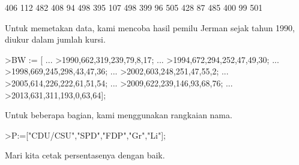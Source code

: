 \documentclass[a4paper,10pt]{article}
\begin{document}
\begin{eulernotebook}
\begin{eulercomment}
\begin{eulercomment}
\begin{euleroutput}
            406           112           482 
            408            94           498 
            395           107           498 
            399            96           505 
            428            87           485 
            400            99           501 
\end{euleroutput}
\begin{eulercomment}
Untuk memetakan data, kami mencoba hasil pemilu Jerman sejak tahun
1990, diukur dalam jumlah kursi.
\end{eulercomment}
\begin{eulerprompt}
>BW := [ ...
>1990,662,319,239,79,8,17; ...
>1994,672,294,252,47,49,30; ...
>1998,669,245,298,43,47,36; ...
>2002,603,248,251,47,55,2; ...
>2005,614,226,222,61,51,54; ...
>2009,622,239,146,93,68,76; ...
>2013,631,311,193,0,63,64];
\end{eulerprompt}
\begin{eulercomment}
Untuk beberapa bagian, kami menggunakan rangkaian nama.
\end{eulercomment}
\begin{eulerprompt}
>P:=["CDU/CSU","SPD","FDP","Gr","Li"];
\end{eulerprompt}
\begin{eulercomment}
Mari kita cetak persentasenya dengan baik.


\end{eulercomment}
\end{eulercomment}
\end{eulercomment}
\end{eulernotebook}
\end{document}

